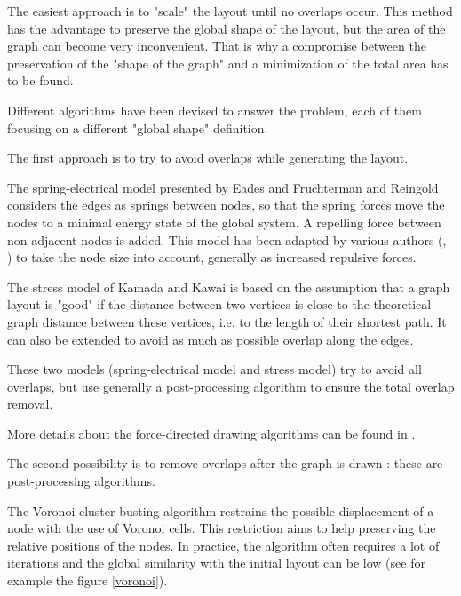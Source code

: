 \documentclass[12pt]{report}
\begin{document}
The easiest approach is to "scale" the layout until no overlaps occur. This method has the advantage to preserve the global shape of the layout, but the area of the graph can become very inconvenient. That is why a compromise between the preservation of the "shape of the graph" and a minimization of the total area has to be found.

Different algorithms have been devised to answer the problem, each of them focusing on a different "global shape" definition. 

\bigskip
The first approach is to try to avoid overlaps while generating the layout.

The spring-electrical model presented by Eades \cite{Eades84} and Fruchterman and Reingold \cite{FR91} considers the edges as springs between nodes, so that the spring forces move the nodes to a minimal energy state of the global system. A repelling force between non-adjacent nodes is added.
This model has been adapted by various authors (\cite{HK02}, \cite{Li05}) to take the node size into account, generally as increased repulsive forces.

The stress model of Kamada and Kawai \cite{Kamada89} is based on the assumption that a graph layout is "good" if the distance between two vertices is close to the theoretical graph distance between these vertices, i.e. to the length of their shortest path. It can also be extended to avoid as much as possible overlap along the edges.

These two models (spring-electrical model and stress model) try to avoid all overlaps, but use generally a post-processing algorithm to ensure the total overlap removal.

More details about the force-directed drawing algorithms can be found in \cite{Kob13}.

\bigskip
The second possibility is to remove overlaps after the graph is drawn : these are post-processing algorithms.

The Voronoi cluster busting algorithm \cite{Gansner98} restrains the possible displacement of a node with the use of Voronoi cells. This restriction aims to help preserving the relative positions of the nodes. In practice, the algorithm often requires a lot of iterations and the global similarity with the initial layout can be low (see for example the figure \ref{voronoi}).
\end{document}
